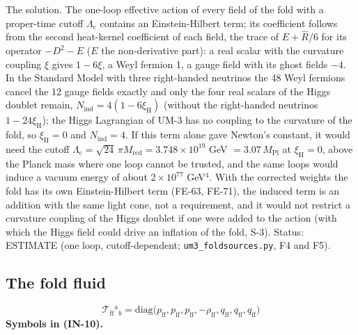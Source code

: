 \documentclass[
  10pt,
]{article}
\begin{document}
The solution. The one-loop effective action of every field of the fold
with a proper-time cutoff \(\Lambda_{\mathrm{c}}\) contains an
Einstein-Hilbert term; its coefficient follows from the second
heat-kernel coefficient of each field, the trace of \(E + \hat R/6\) for
its operator \(-D^2 - E\) (\(E\) the non-derivative part): a real scalar
with the curvature coupling \(\xi\) gives \(1 - 6\xi\), a Weyl fermion
1, a gauge field with its ghost fields \(-4\). In the Standard Model
with three right-handed neutrinos the 48 Weyl fermions cancel the 12
gauge fields exactly and only the four real scalars of the Higgs doublet
remain, \(N_{\mathrm{ind}} = 4(1 - 6\xi_{\mathrm{H}})\) (without the
right-handed neutrinos \(1 - 24\xi_{\mathrm{H}}\)); the Higgs Lagrangian
of UM-3 has no coupling to the curvature of the fold, so
\(\xi_{\mathrm{H}} = 0\) and \(N_{\mathrm{ind}} = 4\). If this term
alone gave Newton's constant, it would need the cutoff
\(\Lambda_{\mathrm{c}} = \sqrt{24}\,\pi M_{\mathrm{red}} = 3.748\times10^{19}\)
GeV \(= 3.07\,M_{\mathrm{Pl}}\) at \(\xi_{\mathrm{H}} = 0\), above the
Planck mass where one loop cannot be trusted, and the same loops would
induce a vacuum energy of about \(2\times10^{77}\) GeV\(^4\). With the
corrected weights the fold has its own Einstein-Hilbert term (FE-63,
FE-71), the induced term is an addition with the same light cone, not a
requirement, and it would not restrict a curvature coupling of the Higgs
doublet if one were added to the action (with which the Higgs field
could drive an inflation of the fold, S-3). Status: ESTIMATE (one loop,
cutoff-dependent; \texttt{um3\_foldsources.py}, F4 and F5).

\hypertarget{the-fold-fluid}{%
\subsection{The fold fluid}\label{the-fold-fluid}}

\[
\mathcal{T}_{\mathrm{ff}}{}^a{}_b = \mathrm{diag}\big(p_{\mathrm{ff}}, p_{\mathrm{ff}}, p_{\mathrm{ff}}, -\rho_{\mathrm{ff}},
 q_{\mathrm{ff}}, q_{\mathrm{ff}}, q_{\mathrm{ff}}\big) \tag{IN-10}
\] \textbf{Symbols in (IN-10).}
\end{document}
